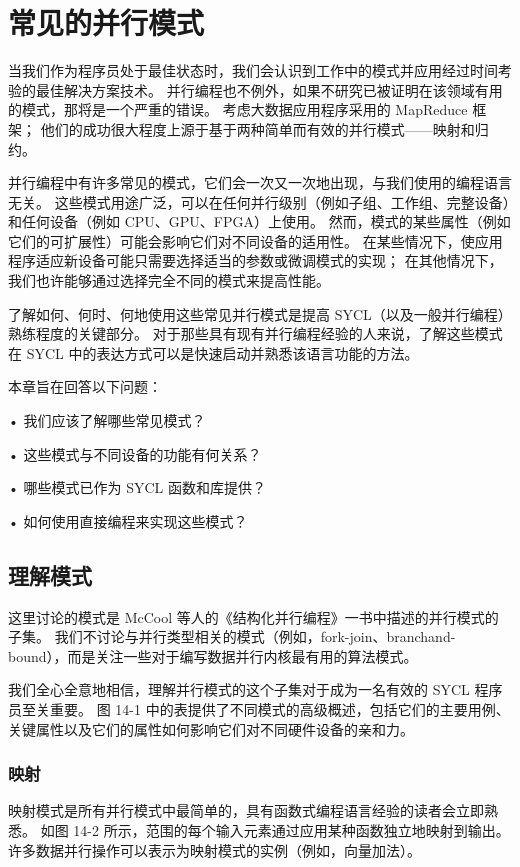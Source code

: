 \section{常见的并行模式}
当我们作为程序员处于最佳状态时，我们会认识到工作中的模式并应用经过时间考验的最佳解决方案技术。 并行编程也不例外，如果不研究已被证明在该领域有用的模式，那将是一个严重的错误。 考虑大数据应用程序采用的 MapReduce 框架； 他们的成功很大程度上源于基于两种简单而有效的并行模式——映射和归约。

并行编程中有许多常见的模式，它们会一次又一次地出现，与我们使用的编程语言无关。 这些模式用途广泛，可以在任何并行级别（例如子组、工作组、完整设备）和任何设备（例如 CPU、GPU、FPGA）上使用。 然而，模式的某些属性（例如它们的可扩展性）可能会影响它们对不同设备的适用性。 在某些情况下，使应用程序适应新设备可能只需要选择适当的参数或微调模式的实现； 在其他情况下，我们也许能够通过选择完全不同的模式来提高性能。

了解如何、何时、何地使用这些常见并行模式是提高 SYCL（以及一般并行编程）熟练程度的关键部分。 对于那些具有现有并行编程经验的人来说，了解这些模式在 SYCL 中的表达方式可以是快速启动并熟悉该语言功能的方法。

本章旨在回答以下问题：

• 我们应该了解哪些常见模式？

• 这些模式与不同设备的功能有何关系？

• 哪些模式已作为 SYCL 函数和库提供？

• 如何使用直接编程来实现这些模式？


\subsection{理解模式}
这里讨论的模式是 McCool 等人的《结构化并行编程》一书中描述的并行模式的子集。 我们不讨论与并行类型相关的模式（例如，fork-join、branchand-bound），而是关注一些对于编写数据并行内核最有用的算法模式。

我们全心全意地相信，理解并行模式的这个子集对于成为一名有效的 SYCL 程序员至关重要。 图 14-1 中的表提供了不同模式的高级概述，包括它们的主要用例、关键属性以及它们的属性如何影响它们对不同硬件设备的亲和力。

\subsubsection{映射}
映射模式是所有并行模式中最简单的，具有函数式编程语言经验的读者会立即熟悉。 如图 14-2 所示，范围的每个输入元素通过应用某种函数独立地映射到输出。 许多数据并行操作可以表示为映射模式的实例（例如，向量加法）。

